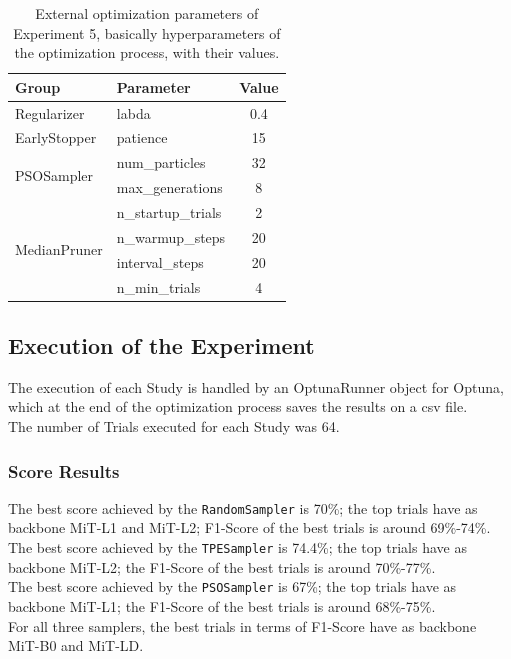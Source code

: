 \begin{table}[ht!]
	\center
	\setlength{\tabcolsep}{0.5cm}
	\caption[Optimization External Parameters of Experiment 5]{External optimization parameters of Experiment 5, basically hyperparameters of the optimization process, with their values.}
	\begin{tabular}{@{}llc@{}}
		\toprule
		\textbf{Group}                & \textbf{Parameter} & \textbf{Value} \\ \midrule
		Regularizer                   & labda              & 0.4            \\[0.1cm]
		EarlyStopper                  & patience           & 15             \\[0.2cm]
		\multirow{2}{*}{PSOSampler}   & num\_particles     & 32             \\[0.1cm]
									  & max\_generations   & 8              \\[0.2cm]
		\multirow{4}{*}{MedianPruner} & n\_startup\_trials & 2              \\[0.1cm]
									  & n\_warmup\_steps   & 20             \\[0.1cm]
									  & interval\_steps    & 20             \\[0.1cm]
									  & n\_min\_trials     & 4              \\ \bottomrule
	\end{tabular}
	\label{tab:table-4.5.2}
\end{table}

\subsection{Execution of the Experiment}

The execution of each Study is handled by an OptunaRunner object for Optuna, which at the end of the optimization process saves the results on a csv file.
\\[0.3cm]The number of Trials executed for each Study was 64.

\subsubsection{Score Results}

The best score achieved by the \texttt{RandomSampler} is 70\%; the top trials have as backbone MiT-L1 and MiT-L2; F1-Score of the best trials is around 69\%-74\%.
\\[0.3cm]The best score achieved by the \texttt{TPESampler} is 74.4\%; the top trials have as backbone MiT-L2; the F1-Score of the best trials is around 70\%-77\%.
\\[0.3cm]The best score achieved by the \texttt{PSOSampler} is 67\%; the top trials have as backbone MiT-L1; the F1-Score of the best trials is around 68\%-75\%.
\\[0.3cm]For all three samplers, the best trials in terms of F1-Score have as backbone MiT-B0 and MiT-LD.

